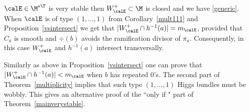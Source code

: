 \begin{remark}
\notreadyWhen $\calE\in \M^{s\T}$ is very stable then $W^+_\calE\subset \M$ is closed and we have \eqref{generic}. %
	When $\calE$ is of type $(1,\dots,1)$ from Corollary~\ref{mult111} and Proposition~\ref{vsintersect} we get that $|W^+_\calE\cap h^{-1}(a)|=m_\calE$, provided that $C_a$ is smooth and $\div(b)$ avoids the ramification divisor of $\pi_a$. Consequently, in this case $W^+_\calE$ and $h^{-1}(a)$ intersect transversally.

	Similarly as above in Proposition~\ref{vsintersect} one can prove that $|W^+_\calE\cap h^{-1}(a)|<m_\calE$ when $b$ has repeated $0$'s. The second part of Theorem~\ref{multiplicity}  implies that such type $(1,\dots,1)$ Higgs bundles must be  wobbly. This gives an alternative proof of the ``only if " part of Theorem~\ref{mainverystable}.
\end{remark}



